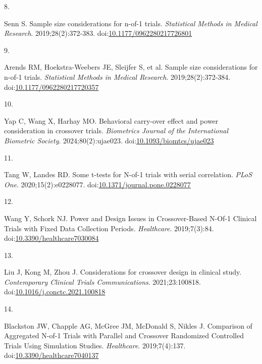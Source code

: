 \documentclass[
  11pt,
]{article}
\newlength{\cslhangindent}
\newlength{\csllabelwidth}
\newenvironment{CSLReferences}[2] %
 {\begin{list}{}{%
  \setlength{\itemindent}{0pt}
  \setlength{\leftmargin}{0pt}
  \setlength{\parsep}{0pt}
  \ifodd #1
   \setlength{\leftmargin}{\cslhangindent}
   \setlength{\itemindent}{-1\cslhangindent}
  \fi
  \setlength{\itemsep}{#2\baselineskip}}}
 {\end{list}}
\newcommand{\CSLLeftMargin}[1]{\parbox[t]{\csllabelwidth}{\strut#1\strut}}
\newcommand{\CSLRightInline}[1]{\parbox[t]{\linewidth - \csllabelwidth}{\strut#1\strut}}
\begin{document}
\begin{CSLReferences}{0}{1}
\CSLLeftMargin{8. }%
\CSLRightInline{Senn S. Sample size considerations for n-of-1 trials.
\emph{Statistical Methods in Medical Research}. 2019;28(2):372-383.
doi:\href{https://doi.org/10.1177/0962280217726801}{10.1177/0962280217726801}}

\CSLLeftMargin{9. }%
\CSLRightInline{{Arends RM, Hoekstra-Weebers JE, Sleijfer S, et al.}
Sample size considerations for n-of-1 trials. \emph{Statistical Methods
in Medical Research}. 2019;28(2):372-384.
doi:\href{https://doi.org/10.1177/0962280217720357}{10.1177/0962280217720357}}

\CSLLeftMargin{10. }%
\CSLRightInline{Yap C, Wang X, Harhay MO. Behavioral carry-over effect
and power consideration in crossover trials. \emph{Biometrics Journal of
the International Biometric Society}. 2024;80(2):ujae023.
doi:\href{https://doi.org/10.1093/biomtcs/ujae023}{10.1093/biomtcs/ujae023}}

\CSLLeftMargin{11. }%
\CSLRightInline{Tang W, Landes RD. Some t-tests for {N-of-1} trials with
serial correlation. \emph{PLoS One}. 2020;15(2):e0228077.
doi:\href{https://doi.org/10.1371/journal.pone.0228077}{10.1371/journal.pone.0228077}}

\CSLLeftMargin{12. }%
\CSLRightInline{Wang Y, Schork NJ. Power and {Design Issues} in
{Crossover-Based N-Of-1 Clinical Trials} with {Fixed Data Collection
Periods}. \emph{Healthcare}. 2019;7(3):84.
doi:\href{https://doi.org/10.3390/healthcare7030084}{10.3390/healthcare7030084}}

\CSLLeftMargin{13. }%
\CSLRightInline{Liu J, Kong M, Zhou J. Considerations for crossover
design in clinical study. \emph{Contemporary Clinical Trials
Communications}. 2021;23:100818.
doi:\href{https://doi.org/10.1016/j.conctc.2021.100818}{10.1016/j.conctc.2021.100818}}

\CSLLeftMargin{14. }%
\CSLRightInline{Blackston JW, Chapple AG, McGree JM, McDonald S, Nikles
J. Comparison of {Aggregated N-of-1 Trials} with {Parallel} and
{Crossover Randomized Controlled Trials Using Simulation Studies}.
\emph{Healthcare}. 2019;7(4):137.
doi:\href{https://doi.org/10.3390/healthcare7040137}{10.3390/healthcare7040137}}


\end{CSLReferences}
\end{document}
